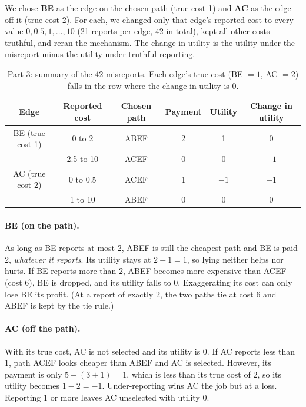 \documentclass[11pt,a4paper]{article}
\begin{document}
We chose \textbf{BE} as the edge on the chosen path (true cost 1) and \textbf{AC} as the edge off it (true cost 2). For each, we changed only that edge's reported cost to every value $0,0.5,1,\ldots,10$ (21 reports per edge, 42 in total), kept all other costs truthful, and reran the mechanism. The change in utility is the utility under the misreport minus the utility under truthful reporting.

\begin{table}[H]
\centering
\caption{Part 3: summary of the 42 misreports. Each edge's true cost (BE $=1$, AC $=2$) falls in the row where the change in utility is $0$.}
\label{tab:part3sweep}
\small
\begin{tabular}{cccccc}
\toprule
Edge & Reported cost & Chosen path & Payment & Utility & Change in utility\\
\midrule
BE (true cost 1) & 0 to 2 & ABEF & 2 & 1 & 0\\
                 & 2.5 to 10 & ACEF & 0 & 0 & $-1$\\
\midrule
AC (true cost 2) & 0 to 0.5 & ACEF & 1 & $-1$ & $-1$\\
                 & 1 to 10 & ABEF & 0 & 0 & 0\\
\bottomrule
\end{tabular}
\end{table}

\paragraph{BE (on the path).} As long as BE reports at most 2, ABEF is still the cheapest path and BE is paid 2, \emph{whatever it reports}. Its utility stays at $2-1=1$, so lying neither helps nor hurts. If BE reports more than 2, ABEF becomes more expensive than ACEF (cost 6), BE is dropped, and its utility falls to 0. Exaggerating its cost can only lose BE its profit. (At a report of exactly 2, the two paths tie at cost 6 and ABEF is kept by the tie rule.)

\paragraph{AC (off the path).} With its true cost, AC is not selected and its utility is 0. If AC reports less than 1, path ACEF looks cheaper than ABEF and AC is selected. However, its payment is only $5-(3+1)=1$, which is less than its true cost of 2, so its utility becomes $1-2=-1$. Under-reporting wins AC the job but at a loss. Reporting 1 or more leaves AC unselected with utility 0.
\end{document}
